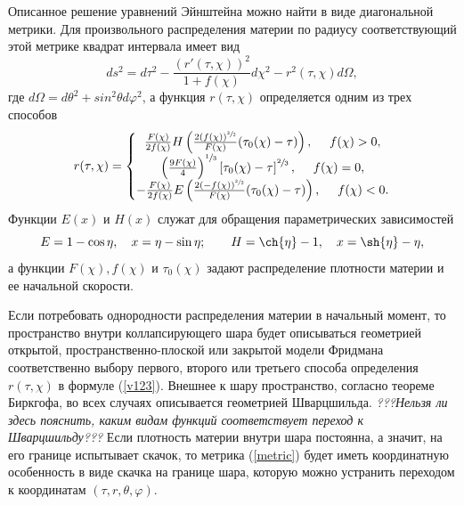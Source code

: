 \documentclass[12pt]{article}
\newcommand{\bq}{\begin{equation}}
\newcommand{\eq}{\end{equation}}
\begin{document}
Описанное решение уравнений Эйнштейна можно найти в виде диагональной метрики. Для произвольного распределения материи по радиусу
соответствующий этой метрике квадрат интервала имеет вид \cite{landavshic2}
\bq
\label{metric}
	d s^2 = d \tau^2 - \frac{(r'(\tau, \chi))^2}{1+f(\chi)} d\chi^2 - r^2(\tau, \chi) d \Omega,
\eq
где $d\Omega=d\theta^2+sin^2\theta d\varphi^2$, а
функция $r(\tau, \chi)$ определяется одним из трех способов
\bq
\label{v123}
	r(\tau, \chi) = \left\{
	\begin{matrix}
	\frac{F(\chi)}{2 f(\chi)} H \left( \frac{2(f(\chi))^{\sfrac{3}{2}} }{F(\chi)}(\tau_0(\chi)-\tau)  \right) , \ \ \ \ f(\chi) > 0,\\
	\left( \frac{9F(\chi)}{4} \right)^{\sfrac{1}{3}} \left[ \tau_0(\chi)- \tau \right]^{\sfrac{2}{3}}, \ \ \ \ f(\chi) = 0, \\
	- \frac{F(\chi)}{2 f(\chi)} E \left( \frac{2(-f(\chi))^{\sfrac{3}{2}} }{F(\chi)}(\tau_0(\chi)-\tau) \right), \ \ \ \ f(\chi) < 0.
	\end{matrix} \right.
\eq
Функции $E(x)$ и $H(x)$  служат для обращения параметрических зависимостей
\bq
E = 1 - \cos{\eta},\quad x = \eta - \sin{\eta};\qquad
H = \ch{\eta}-1,\quad x = \sh{\eta} - \eta,
\eq
а функции $F(\chi), f(\chi)$ и $\tau_0(\chi)$ задают распределение плотности материи и ее начальной скорости.

Если потребовать однородности распределения материи в начальный момент, то пространство внутри коллапсирующего шара будет описываться геометрией открытой, пространственно-плоской или закрытой модели Фридмана соответственно выбору первого, второго или третьего способа определения $r(\tau, \chi)$ в формуле (\ref{v123}).
Внешнее к шару пространство, согласно теореме Биркгофа, во всех случаях описывается геометрией Шварцшильда.
\emph{???Нельзя ли здесь пояснить, каким видам функций соответствует переход к Шварцшильду???}
Если плотность материи внутри шара постоянна, а значит, на его границе испытывает скачок,
то метрика (\ref{metric}) будет иметь координатную особенность в виде скачка на границе шара, которую можно устранить
переходом к координатам $(\tau, r, \theta, \varphi)$.
\end{document}
